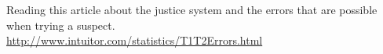 \def\theTopic{Reading 14}


 Reading this article about the justice system and the errors that are
 possible when trying a suspect.\\
\url{http://www.intuitor.com/statistics/T1T2Errors.html}  
